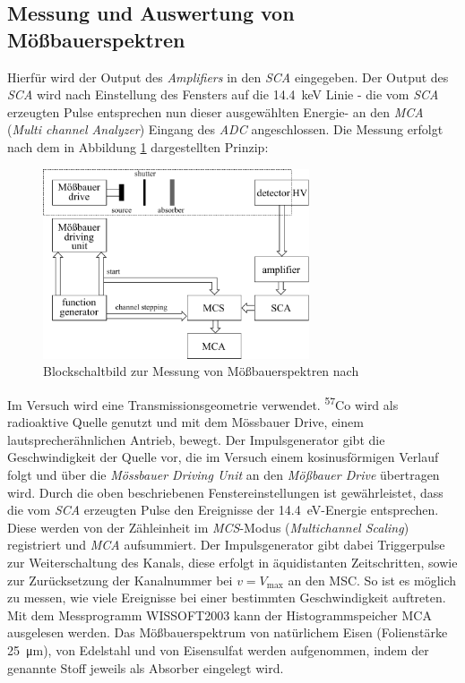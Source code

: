 \documentclass[a4paper,twoside,final]{article}
\begin{document}
\subsection{Messung und Auswertung von Mößbauerspektren}
Hierfür wird der Output des \textit{Amplifiers} in den \textit{SCA} eingegeben. Der Output des \textit{SCA} wird nach Einstellung des Fensters auf die \SI{14,4}{\kilo\eV} Linie - die vom \textit{SCA} erzeugten Pulse entsprechen nun dieser ausgewählten Energie-
an den \textit{MCA} (\textit{Multi channel Analyzer}) Eingang des \textit{ADC} angeschlossen.
Die Messung erfolgt nach dem in Abbildung \ref{fig:BlockMoessbauerspektren} dargestellten Prinzip:
\begin{figure}[htp]\label{fig:BlockMossbauerspektren}
    \centering
    \includegraphics[width=0.7\textwidth]{Schaltungen/Blockschaltbild.pdf}
    \caption{Blockschaltbild zur Messung von Mößbauerspektren nach~\cite{Reisloehner}}
    \label{fig:BlockMoessbauerspektren}
\end{figure}

Im Versuch wird eine Transmissionsgeometrie verwendet. \textsuperscript{57}Co wird als radioaktive Quelle genutzt und mit dem Mössbauer Drive, einem lautsprecherähnlichen Antrieb, bewegt. Der Impulsgenerator gibt die Geschwindigkeit der Quelle vor, die im Versuch einem kosinusförmigen Verlauf folgt und über die \textit{Mössbauer Driving Unit} an den \textit{Mößbauer Drive} übertragen wird. Durch die oben beschriebenen Fenstereinstellungen ist gewährleistet, dass die vom \textit{SCA} erzeugten Pulse den Ereignisse der \SI{14,4}{\electronvolt}-Energie entsprechen. Diese werden von der Zähleinheit im \textit{MCS}-Modus (\textit{Multichannel Scaling}) registriert und \textit{MCA} aufsummiert. Der Impulsgenerator gibt dabei Triggerpulse zur Weiterschaltung des Kanals, diese erfolgt in äquidistanten Zeitschritten, sowie zur Zurücksetzung der Kanalnummer bei $ v = V_\text{max} $ an den MSC.  So ist es möglich zu messen, wie viele Ereignisse bei einer bestimmten Geschwindigkeit auftreten. Mit dem Messprogramm \glqq WISSOFT2003\grqq{} kann der Histogrammspeicher MCA ausgelesen werden.
Das Mößbauerspektrum von natürlichem Eisen (Folienstärke \SI{25}{\micro\meter}), von Edelstahl und von Eisensulfat werden aufgenommen, indem der genannte Stoff jeweils als Absorber eingelegt wird.
\newpage
\end{document}
